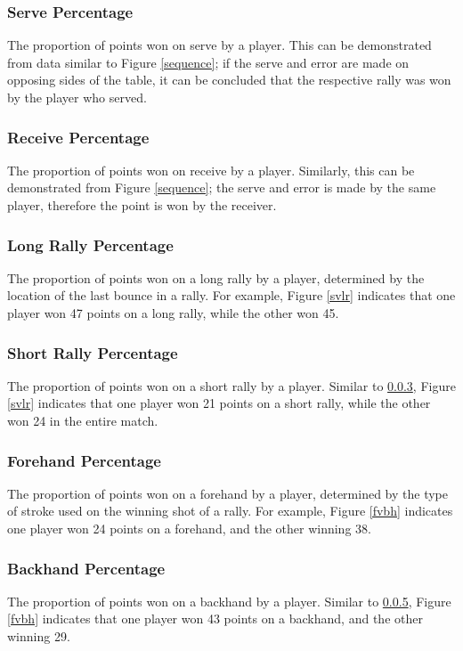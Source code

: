 \subsubsection{Serve Percentage}\label{sp}
The proportion of points won on serve by a player. This can be demonstrated from data similar to Figure \ref{sequence}; if the serve and error are made on opposing sides of the table, it can be concluded that the respective rally was won by the player who served.

\subsubsection{Receive Percentage}\label{rp}
The proportion of points won on receive by a player. Similarly, this can be demonstrated from Figure \ref{sequence}; the serve and error is made by the same player, therefore the point is won by the receiver.

\subsubsection{Long Rally Percentage}\label{lrp}
The proportion of points won on a long rally by a player, determined by the location of the last bounce in a rally. For example, Figure \ref{svlr} indicates that one player won 47 points on a long rally, while the other won 45.

\subsubsection{Short Rally Percentage}\label{srp}
The proportion of points won on a short rally by a player. Similar to \ref{lrp}, Figure \ref{svlr} indicates that one player won 21 points on a short rally, while the other won 24 in the entire match.

\subsubsection{Forehand Percentage}\label{fp}
The proportion of points won on a forehand by a player, determined by the type of stroke used on the winning shot of a rally. For example, Figure \ref{fvbh} indicates one player won 24 points on a forehand, and the other winning 38.

\subsubsection{Backhand Percentage}\label{bp}
The proportion of points won on a backhand by a player. Similar to \ref{fp}, Figure \ref{fvbh} indicates that one player won 43 points on a backhand, and the other winning 29.

